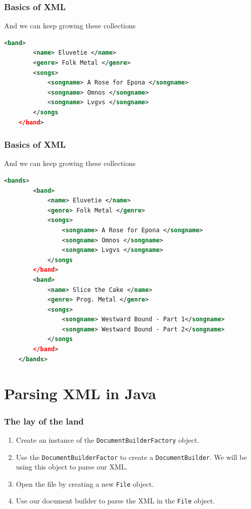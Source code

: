 \documentclass{beamer}
\begin{document}
\begin{frame}[fragile]
    \frametitle{Basics of XML}
    And we can keep growing these collections
    \begin{lstlisting}[basicstyle=\scriptsize, language=XML]
    <band>
        <name> Eluvetie </name>
        <genre> Folk Metal </genre>
        <songs>
            <songname> A Rose for Epona </songname>
            <songname> Omnos </songname>
            <songname> Lvgvs </songname>
        </songs
    </band>
    \end{lstlisting}
\end{frame}

\begin{frame}[fragile]
    \frametitle{Basics of XML}
    And we can keep growing these collections
    \begin{lstlisting}[basicstyle=\scriptsize, language=XML]
    <bands>
        <band>
            <name> Eluvetie </name>
            <genre> Folk Metal </genre>
            <songs>
                <songname> A Rose for Epona </songname>
                <songname> Omnos </songname>
                <songname> Lvgvs </songname>
            </songs
        </band>
        <band>
            <name> Slice the Cake </name>
            <genre> Prog. Metal </genre>
            <songs>
                <songname> Westward Bound - Part 1</songname>
                <songname> Westward Bound - Part 2</songname>
            </songs
        </band>
    </bands>
    \end{lstlisting}
\end{frame}

\section{Parsing XML in Java}
\begin{frame}
    \frametitle{The lay of the land}
    \begin{enumerate}
        \item Create an instance of the \lstinline|DocumentBuilderFactory| object.
        \item Use the \lstinline|DocumentBuilderFactor| to create a \lstinline|DocumentBuilder|. We will be using this object to parse our XML.
        \item Open the file by creating a new \lstinline|File| object.
        \item Use our document builder to parse the XML in the \lstinline|File| object.
    \end{enumerate}
\end{frame}
\end{document}
